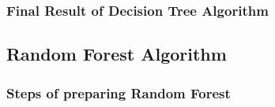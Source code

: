 \documentclass{beamer}
\begin{document}
\begin{frame}
	\frametitle{Final Result of Decision Tree Algorithm}
    \begin{figure}
        
    \end{figure}
    \end{frame}
\subsection{Random Forest Algorithm}
\begin{frame}
	\frametitle{Steps of preparing Random Forest}
    \begin{figure}
    \end{figure}
    \end{frame}
\end{document}
